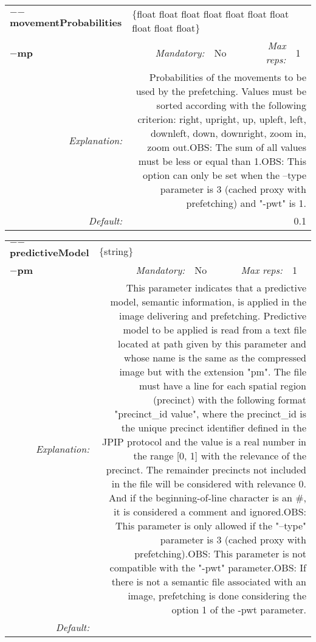 \begin{center}\begin{tabular}{|rr|rl|rl|}
\hline
\multicolumn{2}{|l|}{\textbf{$-$$-$movementProbabilities}} & \multicolumn{4}{|l|}{$\{$float float float float float float float float float float$\}$} \\
\cline{3-6}
\multicolumn{2}{|l|}{\textbf{$-$mp}} & \emph{Mandatory:} & No & \emph{Max reps:} & 1 \\
\hline
\emph{Explanation:} & \multicolumn{5}{|p{12cm}|}{Probabilities of the movements to be used by the prefetching. Values must be sorted according with the following criterion: right, up\-right, up, up\-left, left, down\-left, down, down\-right, zoom in, zoom out.\newline	 OBS: The sum of all values must be less or equal than 1.\newline	OBS: This option can only be set when the --type parameter is 3 (cached proxy with prefetching) and "-pwt" is 1.} \\
\hline
\emph{Default:} & \multicolumn{5}{|p{12cm}|}{0.1} \\
\hline
\end{tabular}\end{center}
\begin{center}\begin{tabular}{|rr|rl|rl|}
\hline
\multicolumn{2}{|l|}{\textbf{$-$$-$predictiveModel}} & \multicolumn{4}{|l|}{$\{$string$\}$} \\
\cline{3-6}
\multicolumn{2}{|l|}{\textbf{$-$pm}} & \emph{Mandatory:} & No & \emph{Max reps:} & 1 \\
\hline
\emph{Explanation:} & \multicolumn{5}{|p{12cm}|}{This parameter indicates that a predictive model, semantic information, is applied in the image delivering and prefetching. Predictive model to be applied is read from a text file located at path given by this parameter and whose name is the same as the compressed image but with the extension "pm". The file must have a line for each spatial region (precinct) with the following format "precinct\_id value", where the precinct\_id is the unique precinct identifier defined in the JPIP protocol and the value is a real number in the range [0, 1] with the relevance of the precinct. The remainder precincts not included in the file will be considered with relevance 0. And if the beginning-of-line character is an \#, it is considered a comment and ignored.\newline OBS: This parameter is only allowed if the "--type" parameter is 3 (cached proxy with prefetching).\newline OBS: This parameter is not compatible with the "-pwt" parameter.\newline OBS: If there is not a semantic file associated with an image, prefetching is done considering the option 1 of the -pwt parameter.} \\
\hline
\emph{Default:} & \multicolumn{5}{|p{12cm}|}{} \\
\hline
\end{tabular}\end{center}
